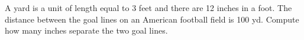 A yard is a unit of length equal to 3 feet and there are 12 inches in a foot. %
The distance between the goal lines on an American football field is 100 yd. 
Compute how many inches separate the two goal lines.
